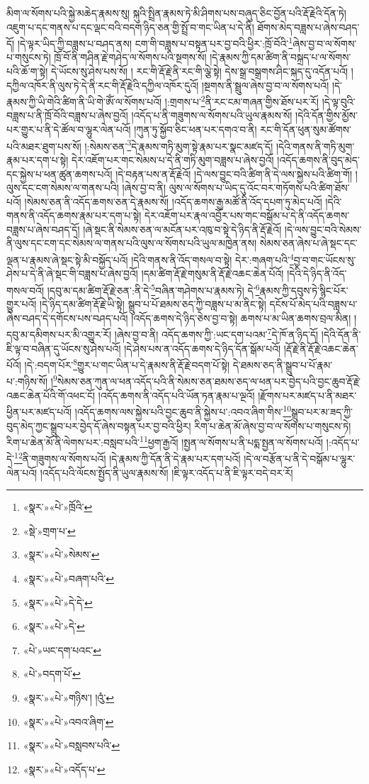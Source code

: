 མིག་ལ་སོགས་པའི་སྐྱེ་མཆེད་རྣམས་སུ། སྐུའི་སྤྲིན་རྣམས་ཏེ་མི་ཤིགས་པས་བཞུད་ཅིང་བྱོན་པའི་རྡོ་རྗེའི་དོན་ཏེ། འཇུག་པ་དང་གནས་པ་དང་ལྡང་བའི་བདག་ཉིད་ཅན་གྱི་སྤྲོ་བ་གང་ཡིན་པ་དེ་ནི། ཐོགས་མེད་བཟླས་པ་ཞེས་བཤད་དོ། །དེ་ལྟར་ཡིད་ཀྱི་བཟླས་པ་བཤད་ནས། ངག་གི་བཟླས་པ་བསྟན་པར་བྱ་བའི་ཕྱིར་:ཁྲོ་བོའི་\footnote{«སྣར་»«པེ་»ཁྲོའི་}ཞེས་བྱ་བ་ལ་སོགས་པ་གསུངས་ཏེ། ཁྲོ་བོ་ནི་གཤིན་རྗེ་གཤེད་ལ་སོགས་པའི་སྔགས་སོ། །དེ་རྣམས་ཀྱི་དམ་ཚིག་ནི་བསྐྲད་པ་ལ་སོགས་པའི་ཆོ་ག་སྟེ། དེ་ཡོངས་སུ་ཤེས་པས་སོ། །
རང་གི་རྡོ་རྗེ་ནི་རང་གི་ལྕེ་སྟེ། དེས་སྒྲ་བསྒྲགས་ཤིང་སྐད་དུ་འདོན་པའོ། །དཀྱིལ་འཁོར་ནི་ལུས་ཏེ་དེ་ནི་རང་གི་རྡོ་རྗེའི་དཀྱིལ་འཁོར་དུའོ། །སྔགས་ནི་སྦྲུལ་ཞེས་བྱ་བ་ལ་སོགས་པའོ། །དེ་རྣམས་ཀྱི་ཡི་གེའི་ཚིག་ནི་ཡི་གེ་ཨོཾ་ལ་སོགས་པའོ། །:གྲགས་པ་\footnote{«སྡེ་»གྲག་པ་}ནི་རང་ངམ་གཞན་གྱིས་ཐོས་པར་རོ། །དེ་ལྟ་བུའི་བཟླས་པ་ནི་ཁྲོ་བོའི་བཟླས་པ་ཞེས་བྱའོ། །འདོད་པ་ནི་གཟུགས་ལ་སོགས་པའི་ཡུལ་རྣམས་སོ། །དེའི་དོན་གྱིས་མྱོས་པར་གྱུར་པ་ནི་དེ་ཚོལ་བ་ལྷུར་ལེན་པའོ། །ཀུན་ཏུ་སྐྱོབ་ཅིང་ཕན་པར་དགའ་བ་ནི། རང་གི་དོན་ཕུན་སུམ་ཚོགས་པའི་མཐར་ཐུག་པས་སོ། །:སེམས་ཅན་\footnote{«སྣར་»«པེ་»སེམས་}དེ་རྣམས་གཏི་མུག་སྟེ་རྣམ་པར་སྣང་མཛད་དོ། །དེའི་གནས་ནི་གཏི་མུག་རྣམ་པར་དག་པ་སྟེ། དེར་འཇོག་པར་གང་སེམས་པ་དེ་ནི་གཏི་མུག་བཟླས་པ་ཞེས་བྱའོ། །འདོད་ཆགས་ནི་བུད་མེད་དང་སྐྱེས་པ་ཕན་ཚུན་ཆགས་པའོ། །དེ་བརྟན་པས་ན་རྡོ་རྗེའོ། །དེ་ལས་བྱུང་བའི་ཚིག་ནི་དེ་ལས་སྐྱེས་པའི་ཚིག་གོ། །ལུས་དང་ངག་སེམས་ལ་གནས་པའི། །ཞེས་བྱ་བ་ནི། ལུས་ལ་སོགས་པ་ཡིད་དུ་འོང་བར་གཏོགས་པའི་ཚིག་ཐོས་པའོ། །སེམས་ཅན་ནི་འདོད་ཆགས་ཅན་དེ་རྣམས་སོ། །འདོད་ཆགས་རྒྱ་མཚོ་ནི་འོད་དཔག་ཏུ་མེད་པའོ། །དེའི་གནས་ནི་འདོད་ཆགས་རྣམ་པར་དག་པ་སྟེ། དེར་འཇོག་པར་རྣལ་འབྱོར་པས་གང་བསྒོམ་པ་དེ་ནི་འདོད་ཆགས་བཟླས་པ་ཞེས་བཤད་དོ། །ཞེ་སྡང་ནི་སེམས་ཅན་ལ་མངོན་པར་འཁུ་བ་སྟེ་དེ་ཉིད་ནི་རྡོ་རྗེའོ། །དེ་ལས་བྱུང་བའི་སེམས་ནི་ལུས་དང་ངག་དང་སེམས་ལ་གནས་པའི་ལུས་ལ་སོགས་པའི་ཡུལ་མཁྱེན་ནས། སེམས་ཅན་ཞེས་པ་ཞེ་སྡང་དང་ལྡན་པ་རྣམས་ཞེ་སྡང་སྟེ་མི་བསྐྱོད་པའོ། །དེའི་གནས་ནི་འོད་གསལ་བ་སྟེ། དེར་:གཞག་པའི་\footnote{«སྣར་»«པེ་»བཞག་པའི་}བྱ་བ་གང་ཡོངས་སུ་ཤེས་པ་དེ་ནི་ཞེ་སྡང་གི་བཟླས་པ་ཞེས་བྱའོ། །དམ་ཚིག་རྡོ་རྗེ་གསུམ་ནི་རྡོ་རྗེ་འཆང་ཆེན་པོའོ། །དེའི་དེ་ཉིད་ནི་འོད་གསལ་བའོ། །དབུ་མ་དམ་ཚིག་རྡོ་རྗེ་ཅན་:ནི་དེ་\footnote{«སྣར་»«པེ་»དེ་དེ་}བཞིན་གཤེགས་པ་རྣམས་ཏེ། དེ་\footnote{«སྣར་»«པེ་»དེ་}རྣམས་ཀྱི་དབུས་ཏེ་སྙིང་པོར་གྱུར་པའོ། །དེ་ཉིད་དམ་ཚིག་རྡོ་རྗེ་ཡི་སྟེ། སྒྲུབ་པ་པོ་ཐམས་ཅད་ཀྱི་བཟླས་པ་མ་ནིང་སྟེ། དངོས་པོ་མེད་པའི་བཟླས་པ་ཞེས་བཤད་དེ་དགོངས་པས་བཤད་པའོ། །འདོད་ཆགས་དེ་ཉིད་ཅེས་བྱ་བ་སྟེ། ཆགས་པ་མ་ཡིན་ཆགས་བྲལ་མིན། །དབུ་མ་དམིགས་པར་མི་འགྱུར་རོ། །ཞེས་བྱ་བ་ནི། འདོད་ཆགས་ཀྱི་:ཡང་དག་པའམ་\footnote{«པེ་»ཡང་དག་པའང་}དེ་ཁོ་ན་ཉིད་དོ། །དེའི་དོན་ནི་ཇི་ལྟ་བ་བཞིན་དུ་ཡོངས་སུ་ཤེས་པའོ། །དེ་ཤེས་པས་ན་འདོད་ཆགས་དེ་ཉིད་དོན་སྒོམ་པའོ། །རྡོ་རྗེ་ནི་རྡོ་རྗེ་འཆང་ཆེན་པོའོ། །དེ་:བདག་པོར་\footnote{«པེ་»བདག་པོ་}གྱུར་པ་གང་ཡིན་པ་དེ་རྣམས་ནི་རྡོ་རྗེ་བདག་པོ་སྟེ། དེ་ཐམས་ཅད་ནི་སྒྲུབ་པ་པོ་རྣམ་པ་:གཉིས་སོ། །\footnote{«སྣར་»«པེ་»གཉིས་། །འུཾ་}སེམས་ཅན་ཀུན་ལ་ཕན་འདོད་པའི་ནི་སེམས་ཅན་ཐམས་ཅད་ལ་ཕན་པར་བྱེད་པའི་བྱང་ཆུབ་རྡོ་རྗེ་འཆང་ཆེན་པོའི་གོ་འཕང་ངོ། །འདོད་ཆགས་ནི་འདོད་པའི་ཡོན་ཏན་རྣམ་པ་ལྔའོ། །རྫོགས་པར་མཛད་པ་ནི་མཐར་ཕྱིན་པར་མཛད་པའོ། །འདོད་ཆགས་ལས་སྐྱེས་པའི་བྱང་ཆུབ་ནི་སྐྱེས་པ་:འབའ་ཞིག་གིས་\footnote{«སྣར་»«པེ་»འབའ་ཞིག་}སྒྲུབ་པར་མ་ཟད་ཀྱི་བུད་མེད་ཀྱང་སྒྲུབ་པར་བྱེད་དོ་ཞེས་བསྟན་པར་བྱ་བའི་ཕྱིར། རིག་པ་ཆེན་མོ་ཞེས་བྱ་བ་ལ་སོགས་པ་གསུངས་ཏེ། རིག་པ་ཆེན་མོ་ནི་ལེགས་པར་:བསླབ་པའི་\footnote{«སྣར་»«པེ་»བསླབས་པའི་}ཕྱག་རྒྱའོ། །སྤྱན་ལ་སོགས་པ་ནི་པདྨ་སྤྱན་ལ་སོགས་པའོ། །:འདོད་པ་དེ་\footnote{«སྣར་»«པེ་»འདོད་པ་}ནི་གཟུགས་ལ་སོགས་པའོ། །དེ་རྣམས་ཀྱི་དོན་ནི་དེ་རྣམ་པར་དག་པའོ། །དེ་ལ་བརྩོན་པ་ནི་དེ་བསྒོམ་པ་ལྷུར་ལེན་པའོ། །འདོད་པའི་ལོངས་སྤྱོད་ནི་ཡུལ་རྣམས་སོ། །ཇི་ལྟར་འདོད་པ་ནི་ཇི་ལྟར་བདེ་བར་རོ། 